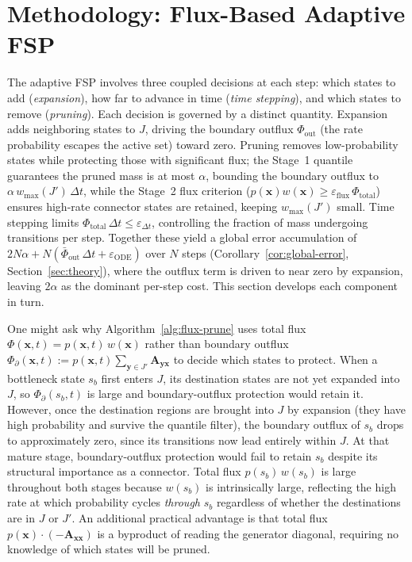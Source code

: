 \documentclass[onefignum,onetabnum]{siamart171218}
\begin{document}
\section{Methodology: Flux-Based Adaptive FSP}
\label{sec:methodology}

The adaptive FSP involves three coupled decisions at each step: which states to add (\emph{expansion}), how far to advance in time (\emph{time stepping}), and which states to remove (\emph{pruning}).  Each decision is governed by a distinct quantity.  Expansion adds neighboring states to $J$, driving the boundary outflux $\Phi_{\mathrm{out}}$ (the rate probability escapes the active set) toward zero.  Pruning removes low-probability states while protecting those with significant flux; the Stage~1 quantile guarantees the pruned mass is at most $\alpha$, bounding the boundary outflux to $\alpha\,w_{\max}(J')\,\Delta t$, while the Stage~2 flux criterion ($p(\boldsymbol{x})w(\boldsymbol{x}) \geq \varepsilon_{\mathrm{flux}}\,\Phi_{\mathrm{total}}$) ensures high-rate connector states are retained, keeping $w_{\max}(J')$ small.  Time stepping limits $\Phi_{\mathrm{total}}\,\Delta t \leq \varepsilon_{\Delta t}$, controlling the fraction of mass undergoing transitions per step.  Together these yield a global error accumulation of $2N\alpha + N(\bar{\Phi}_{\mathrm{out}}\,\Delta t + \varepsilon_{\mathrm{ODE}})$ over $N$ steps (Corollary~\ref{cor:global-error}, Section~\ref{sec:theory}), where the outflux term is driven to near zero by expansion, leaving $2\alpha$ as the dominant per-step cost.  This section develops each component in turn.

\begin{remark}
\label{rem:total-flux-criterion}
One might ask why Algorithm~\ref{alg:flux-prune} uses total flux $\Phi(\boldsymbol{x},t) = p(\boldsymbol{x},t)\,w(\boldsymbol{x})$ rather than boundary outflux $\Phi_\partial(\boldsymbol{x},t) := p(\boldsymbol{x},t)\sum_{\boldsymbol{y}\in J'}\mathbf{A}_{\boldsymbol{y}\boldsymbol{x}}$ to decide which states to protect.
When a bottleneck state $s_b$ first enters $J$, its destination states are not yet expanded into $J$, so $\Phi_\partial(s_b,t)$ is large and boundary-outflux protection would retain it.
However, once the destination regions are brought into $J$ by expansion (they have high probability and survive the quantile filter), the boundary outflux of $s_b$ drops to approximately zero, since its transitions now lead entirely within $J$.
At that mature stage, boundary-outflux protection would fail to retain $s_b$ despite its structural importance as a connector.
Total flux $p(s_b)\,w(s_b)$ is large throughout both stages because $w(s_b)$ is intrinsically large, reflecting the high rate at which probability cycles \emph{through} $s_b$ regardless of whether the destinations are in $J$ or $J'$.
An additional practical advantage is that total flux $p(\boldsymbol{x})\cdot(-\mathbf{A}_{\boldsymbol{x}\boldsymbol{x}})$ is a byproduct of reading the generator diagonal, requiring no knowledge of which states will be pruned.
\end{remark}
\end{document}
